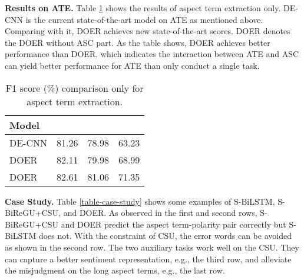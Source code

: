\documentclass[11pt,a4paper]{article}
\begin{document}
	\vspace{+1.5mm}
	\noindent
	\textbf{Results on ATE.} \quad Table \ref{table-results-ate} shows the results of aspect term extraction only. DE-CNN is the current state-of-the-art model on ATE as mentioned above. Comparing with it, DOER achieves new state-of-the-art scores. DOER denotes the DOER without ASC part. As the table shows, DOER achieves better performance than DOER, which indicates the interaction between ATE and ASC can yield better performance for ATE than only conduct a single task.
	\begin{table}[htbp]
		\begin{center}
			\begin{tabular}{|l|p{1.4cm}<{\centering}|p{1.4cm}<{\centering}|p{1.4cm}<{\centering}|}
				\hline
				\textbf{Model}     &  &  &  \\ \hline 
				DE-CNN             & 81.26 & 78.98 & 63.23  \\ 
				DOER           & 82.11 & 79.98 & 68.99  \\ 
				DOER               & 82.61 & 81.06 & 71.35 \\ \hline
				\end{tabular}
		\end{center}
		\caption{\label{table-results-ate} F1 score (\%) comparison only for aspect term extraction.}
	\end{table}

	\vspace{+1.5mm}
	\noindent
	\textbf{Case Study.} \quad Table \ref{table-case-study} shows some examples of S-BiLSTM, S-BiReGU+CSU, and DOER. As observed in the first and second rows, S-BiReGU+CSU and DOER predict the aspect term-polarity pair correctly but S-BiLSTM does not. With the constraint of CSU, the error words can be avoided as shown in the second row. The two auxiliary tasks work well on the CSU. They can capture a better sentiment representation, e.g., the third row, and alleviate the misjudgment on the long aspect terms, e.g., the last row.
\end{document}
